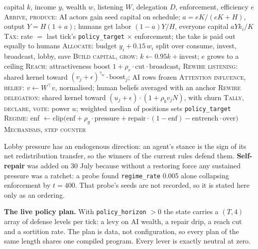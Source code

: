 \documentclass[11pt]{article}
\newcommand{\code}[1]{\texttt{#1}}
\begin{document}
\begin{algorithm}[H]
\caption{One tick of \code{ledger\_society} (program order derived from declared reads and writes)}
\begin{algorithmic}[1]
\Require capital $k$, income $y$, wealth $w$, listening $W$, delegation $D$, enforcement, efficiency $e$
\State \textsc{Arrive, produce:} AI actors gain seed capital on schedule; $a = eK/(eK+H)$, output $Y=H(1+a)$; humans get labor $(1-a)Y/H$, everyone capital $aYk_i/K$
\State \textsc{Tax:} rate $=$ last tick's \code{policy\_target} $\times$ enforcement; the take is paid out equally to humans
\State \textsc{Allocate:} budget $y_i + 0.15\,w_i$ split over consume, invest, broadcast, lobby, save
\State \textsc{Build capital, grow:} $k \gets 0.95k + \text{invest}$; $e$ grows to a ceiling
\State \textsc{Reach:} attractiveness boost $1 + \rho_r \cdot \text{cut} \cdot \text{broadcast}_i$ 
\State \textsc{Rewire listening:} shared kernel toward $(v_j+\epsilon)^{\gamma_w}\cdot\text{boost}_j$; AI rows frozen
\State \textsc{Attention influence, belief:} $v \gets W^\top v$, normalised; human beliefs averaged with an anchor
\State \textsc{Rewire delegation:} shared kernel toward $(u_j+\epsilon)\cdot(1+\rho_b v_j N)$, with churn 
\State \textsc{Tally, declare, vote:} power $u$; weighted median of positions sets \code{policy\_target}
\State \textsc{Regime:} enf $\gets \mathrm{clip}\big(\text{enf} + \rho_g\cdot\text{pressure} + \text{repair}\cdot(1-\text{enf}) - \text{entrench}\cdot\text{over}\big)$ 
\State \textsc{Mechanisms, step counter}
\end{algorithmic}
\end{algorithm}

\noindent Lobby pressure has an endogenous direction: an agent's stance is the sign of
its net redistribution transfer, so the winners of the current rules defend them.
\textbf{Self-repair} was added on 30 July because without a restoring force any
sustained pressure was a ratchet: a probe found \code{regime\_rate} 0.005 alone
collapsing enforcement by $t=400$. That probe's seeds are not recorded, so it is
stated here only as an ordering.

\textbf{The live policy plan.} With \code{policy\_horizon} $>0$ the state carries a
$(T,4)$ array of defense levels per tick: a levy on AI wealth, a repair drip, a reach
cut and a sortition rate. The plan is data, not configuration, so every plan of the
same length shares one compiled program. Every lever is exactly neutral at zero.
\end{document}
